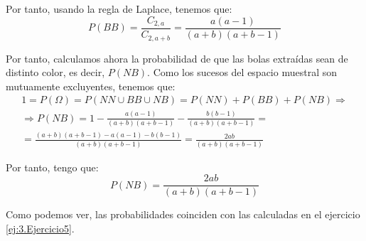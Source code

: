 \begin{ejercicio}
\begin{enumerate}
        Por tanto, usando la regla de Laplace, tenemos que:
        \begin{equation*}
            P(BB)=\frac{C_{2,a}}{C_{2,a+b}} = \frac{a(a-1)}{(a+b)(a+b-1)}
        \end{equation*}
    \end{enumerate}

    Por tanto, calculamos ahora la probabilidad de que las bolas extraídas sean de distinto color, es decir, $P(NB)$. Como los sucesos del espacio muestral son mutuamente excluyentes, tenemos que:
    \begin{multline*}
        1=P(\Omega) = P(NN\cup BB \cup NB) =P(NN)+P(BB)+P(NB)
        \Longrightarrow \\ \Longrightarrow
        P(NB)=1-\frac{a(a-1)}{(a+b)(a+b-1)}-\frac{b(b-1)}{(a+b)(a+b-1)} =\\= \frac{(a+b)(a+b-1)-a(a-1)-b(b-1)}{(a+b)(a+b-1)} = \frac{2ab}{(a+b)(a+b-1)}
    \end{multline*}

    Por tanto, tengo que:
    \begin{equation*}
        P(NB)=\frac{2ab}{(a+b)(a+b-1)}
    \end{equation*}

    \begin{observacion}
        Como podemos ver, las probabilidades coinciden con las calculadas en el ejercicio \ref{ej:3.Ejercicio5}.
    \end{observacion}
\end{ejercicio}

